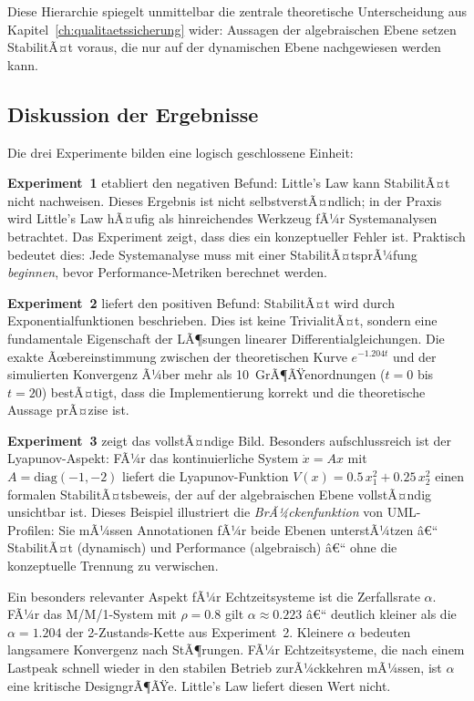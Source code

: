 ﻿\documentclass[a4paper,12pt]{report}
\theoremstyle{definition}
\begin{document}
Diese Hierarchie spiegelt unmittelbar die zentrale theoretische Unterscheidung aus Kapitel~\ref{ch:qualitaetssicherung} wider: Aussagen der algebraischen Ebene setzen StabilitÃ¤t voraus, die nur auf der dynamischen Ebene nachgewiesen werden kann.

\subsection{Diskussion der Ergebnisse}
\label{subsubsec:ergebnisse-diskussion}

Die drei Experimente bilden eine logisch geschlossene Einheit:

\textbf{Experiment~1} etabliert den negativen Befund: Little's Law
kann StabilitÃ¤t nicht nachweisen.  Dieses Ergebnis ist nicht
selbstverstÃ¤ndlich; in der Praxis wird Little's Law hÃ¤ufig als
hinreichendes Werkzeug fÃ¼r Systemanalysen betrachtet.  Das Experiment
zeigt, dass dies ein konzeptueller Fehler ist.  Praktisch bedeutet
dies: Jede Systemanalyse muss mit einer StabilitÃ¤tsprÃ¼fung
\emph{beginnen}, bevor Performance-Metriken berechnet werden.

\textbf{Experiment~2} liefert den positiven Befund: StabilitÃ¤t wird
durch Exponentialfunktionen beschrieben.  Dies ist keine TrivialitÃ¤t,
sondern eine fundamentale Eigenschaft der LÃ¶sungen linearer
Differentialgleichungen.  Die exakte Ãœbereinstimmung zwischen der
theoretischen Kurve $e^{-1.204t}$ und der simulierten Konvergenz
Ã¼ber mehr als 10~GrÃ¶ÃŸenordnungen ($t = 0$ bis $t = 20$) bestÃ¤tigt,
dass die Implementierung korrekt und die theoretische Aussage prÃ¤zise
ist.

\textbf{Experiment~3} zeigt das vollstÃ¤ndige Bild.  Besonders
aufschlussreich ist der Lyapunov-Aspekt: FÃ¼r das kontinuierliche
System $\dot{x} = Ax$ mit $A = \text{diag}(-1,-2)$ liefert die
Lyapunov-Funktion $V(x) = 0.5\,x_1^2 + 0.25\,x_2^2$ einen
formalen StabilitÃ¤tsbeweis, der auf der algebraischen Ebene
vollstÃ¤ndig unsichtbar ist.  Dieses Beispiel illustriert die
\emph{BrÃ¼ckenfunktion} von UML-Profilen: Sie mÃ¼ssen Annotationen
fÃ¼r beide Ebenen unterstÃ¼tzen â€“ StabilitÃ¤t (dynamisch) und
Performance (algebraisch) â€“ ohne die konzeptuelle Trennung zu
verwischen.

Ein besonders relevanter Aspekt fÃ¼r Echtzeitsysteme ist die
Zerfallsrate $\alpha$.  FÃ¼r das M/M/1-System mit $\rho = 0.8$ gilt
$\alpha \approx 0.223$ â€“ deutlich kleiner als die $\alpha = 1.204$
der 2-Zustands-Kette aus Experiment~2.  Kleinere $\alpha$ bedeuten
langsamere Konvergenz nach StÃ¶rungen.  FÃ¼r Echtzeitsysteme, die
nach einem Lastpeak schnell wieder in den stabilen Betrieb zurÃ¼ckkehren
mÃ¼ssen, ist $\alpha$ eine kritische DesigngrÃ¶ÃŸe.  Little's Law
liefert diesen Wert nicht.
\end{document}
